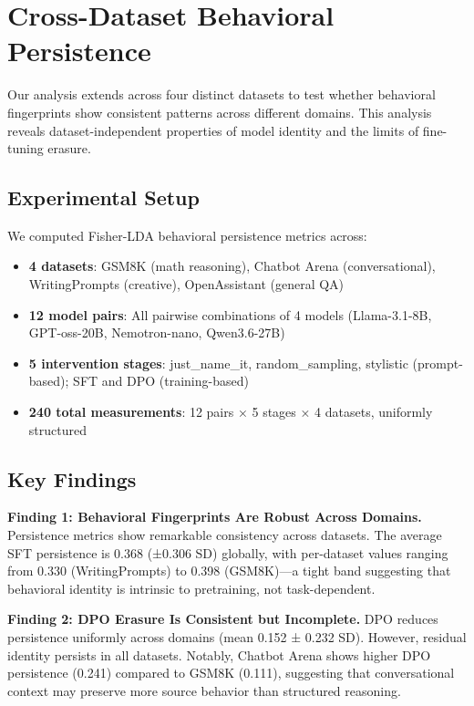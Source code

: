 \documentclass{article}
\begin{document}
\section{Cross-Dataset Behavioral Persistence}

Our analysis extends across four distinct datasets to test whether behavioral fingerprints show consistent patterns across different domains. This analysis reveals dataset-independent properties of model identity and the limits of fine-tuning erasure.

\subsection*{Experimental Setup}

We computed Fisher-LDA behavioral persistence metrics across:
\begin{itemize}
\item \textbf{4 datasets}: GSM8K (math reasoning), Chatbot Arena (conversational), WritingPrompts (creative), OpenAssistant (general QA)
\item \textbf{12 model pairs}: All pairwise combinations of 4 models (Llama-3.1-8B, GPT-oss-20B, Nemotron-nano, Qwen3.6-27B)
\item \textbf{5 intervention stages}: just\_name\_it, random\_sampling, stylistic (prompt-based); SFT and DPO (training-based)
\item \textbf{240 total measurements}: 12 pairs × 5 stages × 4 datasets, uniformly structured
\end{itemize}

\subsection*{Key Findings}

\textbf{Finding 1: Behavioral Fingerprints Are Robust Across Domains.}
Persistence metrics show remarkable consistency across datasets. The average SFT persistence is 0.368 (±0.306 SD) globally, with per-dataset values ranging from 0.330 (WritingPrompts) to 0.398 (GSM8K)—a tight band suggesting that behavioral identity is intrinsic to pretraining, not task-dependent.

\textbf{Finding 2: DPO Erasure Is Consistent but Incomplete.}
DPO reduces persistence uniformly across domains (mean 0.152 ± 0.232 SD). However, residual identity persists in all datasets. Notably, Chatbot Arena shows higher DPO persistence (0.241) compared to GSM8K (0.111), suggesting that conversational context may preserve more source behavior than structured reasoning.
\end{document}
